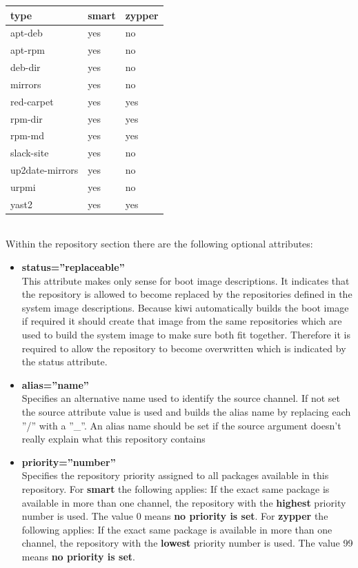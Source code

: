 \begin{tabular}[h]{|p{4cm}|p{2cm}|p{2cm}|}
\hline
\textbf{type} & \textbf{smart} & \textbf{zypper} \\
\hline
apt-deb            & yes & no  \\
apt-rpm            & yes & no  \\
deb-dir            & yes & no  \\
mirrors            & yes & no  \\
red-carpet         & yes & yes \\
rpm-dir            & yes & yes \\
rpm-md             & yes & yes \\ 
slack-site         & yes & no  \\
up2date-mirrors    & yes & no  \\
urpmi              & yes & no  \\
yast2              & yes & yes \\
\hline
\end{tabular}\\

Within the repository section there are the following optional
attributes:

\begin{itemize}
\item \textbf{status=''replaceable''}\\
      This attribute makes only sense for boot image descriptions.
      It indicates that the repository is allowed to become replaced by
      the repositories defined in the system image descriptions. Because kiwi
      automatically builds the boot image if required it should create that
      image from the same repositories which are used to build the system
      image to make sure both fit together. Therefore it is required to allow
      the repository to become overwritten which is indicated by the status
      attribute.
\item \textbf{alias=''name''}\\
      Specifies an alternative name used to identify the source channel.
      If not set the source attribute value is used and builds the alias name
      by replacing each ''/'' with a ''\_''. An alias name should be set if
      the source argument doesn't really explain what this repository
      contains 
\item \textbf{priority=''number''}\\
      Specifies the repository priority assigned to all packages available in
      this repository. For \textbf{smart} the following applies: If the
      exact same package is available in more than one channel, the repository
      with the \textbf{highest} priority number is used. The value 0 means
      \textbf{no priority is set}. For \textbf{zypper} the following applies:
      If the exact same package is available in more than one channel, the
      repository with the \textbf{lowest} priority number is used. The value
      99 means \textbf{no priority is set}.
\end{itemize}

